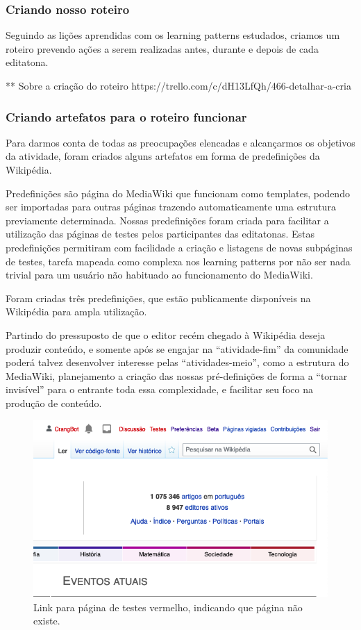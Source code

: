 \subsubsection{Criando nosso roteiro}

Seguindo as lições aprendidas com os learning patterns estudados, criamos um roteiro prevendo ações a serem realizadas antes, durante e depois de cada editatona. 

** Sobre a criação do roteiro https://trello.com/c/dH13LfQh/466-detalhar-a-cria%

\subsubsection{Criando artefatos para o roteiro funcionar}

Para darmos conta de todas as preocupações elencadas e alcançarmos os objetivos da atividade, foram criados alguns artefatos em forma de predefinições da Wikipédia.

Predefinições são página do MediaWiki que funcionam como templates, podendo ser importadas para outras páginas trazendo automaticamente uma estrutura previamente determinada. Nossas predefinições foram criada para facilitar a utilização das páginas de testes pelos participantes das editatonas. Estas predefinições permitiram com facilidade a criação e listagens de novas subpáginas de testes, tarefa mapeada como complexa nos learning patterns por não ser nada trivial para um usuário não habituado ao funcionamento do MediaWiki.

Foram criadas três predefinições, que estão publicamente disponíveis na Wikipédia para ampla utilização. 

Partindo do pressuposto de que o editor recém chegado à Wikipédia deseja produzir conteúdo, e somente após se engajar na ``atividade-fim'' da comunidade poderá talvez desenvolver interesse pelas ``atividades-meio'', como a estrutura do MediaWiki, planejamento a criação das nossas pré-definições de forma a ``tornar invisível'' para o entrante toda essa complexidade, e facilitar seu foco na produção de conteúdo.

\begin{figure}[H]
    \centering
    \includegraphics[width=1\textwidth]{Images/link_testes_vermelho.png}
    \caption{Link para página de testes vermelho, indicando que página não existe.}
    \label{fig:link_testes_vermelho}
\end{figure}

